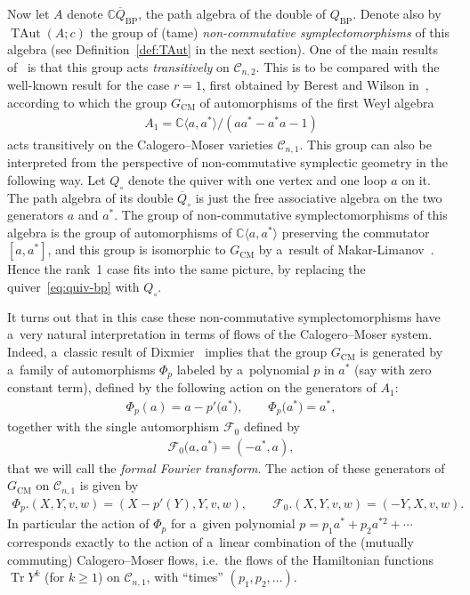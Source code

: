 \documentclass[pdftex]{sigma}
\newcommand{\bb}[1]{\mathbb{#1}}
\newcommand{\ol}[1]{\overline{#1}}
\DeclareMathOperator{\tr}{Tr}
\DeclareMathOperator{\TAut}{TAut}
\begin{document}
Now let \(A\) denote \(\bb{C}\ol{Q}_{\mathrm{BP}}\), the path algebra of the double of \(Q_{\mathrm{BP}}\).
Denote also by \(\TAut(A;c)\) the group of (tame) \emph{non-commutative symplectomorphisms} of this algebra
(see Def\/inition~\ref{def:TAut} in the next section).
One of the main results of~\cite{bp08} is that this group acts \emph{transitively} on \(\mathcal{C}_{n,2}\).
This is to be compared with the well-known result for the case \(r=1\), f\/irst obtained by Berest and
Wilson in~\cite{bw00}, according to which the group \(G_{\mathrm{CM}}\) of automorphisms of the f\/irst
Weyl algebra
\begin{gather*}
A_{1}=\bb{C}\langle a,a^{*}\rangle/(aa^{*}-a^{*}a-1)
\end{gather*}
acts transitively on the Calogero--Moser varieties \(\mathcal{C}_{n,1}\).
This group can also be interpreted from the perspective of non-commutative symplectic geometry in the
following way.
Let \(Q_{\circ}\) denote the quiver with one vertex and one loop \(a\) on it.
The path algebra of its double \(\ol{Q}_{\circ}\) is just the free associative algebra on the two
generators \(a\) and \(a^{*}\).
The group of non-commutative symplectomorphisms of this algebra is the group of automorphisms of
\(\bb{C}\langle a,a^{*}\rangle\) preserving the commutator \([a,a^{*}]\), and this group is isomorphic to
\(G_{\mathrm{CM}}\) by a~result of Makar-Limanov~\cite{ml84, ml70}.
Hence the rank~1 case f\/its into the same picture, by replacing the quiver~\eqref{eq:quiv-bp} with
\(Q_{\circ}\).

It turns out that in this case these non-commutative symplectomorphisms have a~very natural interpretation
in terms of f\/lows of the Calogero--Moser system.
Indeed, a~classic result of Dixmier~\cite{dix68} implies that the group \(G_{\mathrm{CM}}\) is generated by
a~family of automorphisms \(\Phi_{p}\) labeled by a~polynomial \(p\) in \(a^{*}\) (say with zero constant
term), def\/ined by the following action on the generators of \(A_{1}\):
\begin{gather}
\label{eq:def-cmflows}
\Phi_{p}(a)=a-p'\big(a^{*}\big),
\qquad
\Phi_{p}\big(a^{*}\big)=a^{*},
\end{gather}
together with the single automorphism \(\mathcal{F}_{0}\) def\/ined by
\begin{gather}
\label{eq:fft0}
\mathcal{F}_{0}\big(a,a^{*}\big)=(-a^{*},a),
\end{gather}
that we will call the \emph{formal Fourier transform}.
The action of these generators of \(G_{\mathrm{CM}}\) on \(\mathcal{C}_{n,1}\) is given by
\begin{gather*}
\Phi_{p}.(X,Y,v,w)=(X-p'(Y),Y,v,w),
\qquad
\mathcal{F}_{0}.(X,Y,v,w)=(-Y,X,v,w).
\end{gather*}
In particular the action of \(\Phi_{p}\) for a~given polynomial \(p = p_{1}a^{*} + p_{2}a^{*2} + \cdots\)
corresponds exactly to the action of a~linear combination of the (mutually commuting) Calogero--Moser
f\/lows, i.e.\
the f\/lows of the Hamiltonian functions \(\tr Y^{k}\) (for \(k\geq 1\)) on \(\mathcal{C}_{n,1}\), with
``times'' \((p_{1}, p_{2}, \dots)\).
\end{document}
